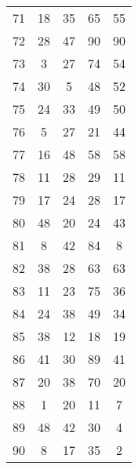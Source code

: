 \documentclass[a4paper,10pt,ngerman]{scrartcl}
\begin{document}
\begin{longtable}[c]{c|c|c|c|c}
    71 & 18 & 35 & 65 & 55 \\
    72 & 28 & 47 & 90 & 90 \\
    73 & 3 & 27 & 74 & 54 \\
    74 & 30 & 5 & 48 & 52 \\
    75 & 24 & 33 & 49 & 50 \\
    76 & 5 & 27 & 21 & 44 \\
    77 & 16 & 48 & 58 & 58 \\
    78 & 11 & 28 & 29 & 11 \\
    79 & 17 & 24 & 28 & 17 \\
    80 & 48 & 20 & 24 & 43 \\
    81 & 8 & 42 & 84 & 8 \\
    82 & 38 & 28 & 63 & 63 \\
    83 & 11 & 23 & 75 & 36 \\
    84 & 24 & 38 & 49 & 34 \\
    85 & 38 & 12 & 18 & 19 \\
    86 & 41 & 30 & 89 & 41 \\
    87 & 20 & 38 & 70 & 20 \\
    88 & 1 & 20 & 11 & 7 \\
    89 & 48 & 42 & 30 & 4 \\
    90 & 8 & 17 & 35 & 2
\end{longtable}
\end{document}
